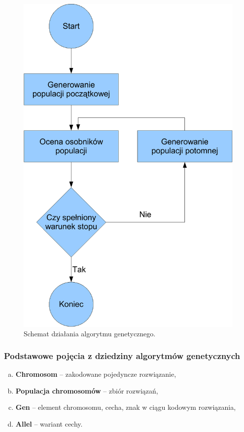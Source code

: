 \begin{figure}[t]
\centering\includegraphics[scale=0.5]{figures/genetyczny_schemat.pdf}
\caption{Schemat działania algorytmu genetycznego.}\label{rys:genetyczny}
\end{figure}

\subsubsection*{Podstawowe pojęcia z dziedziny algorytmów genetycznych}
\begin{enumerate}[a)]
    \item \textbf{Chromosom} -- zakodowane pojedyncze rozwiązanie,
    \item \textbf{Populacja chromosomów} -- zbiór rozwiązań,
    \item \textbf{Gen} -- element chromosomu, cecha, znak w ciągu kodowym rozwiązania,
    \item \textbf{Allel} -- wariant cechy.
\end{enumerate}

